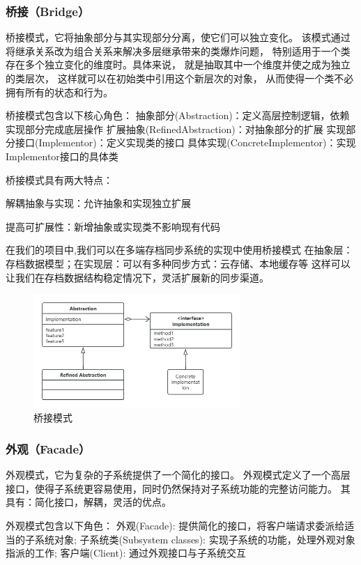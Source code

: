 \documentclass[12pt]{ctexart} %
\begin{document}
\subsubsection{桥接（Bridge）} 
桥接模式，它将抽象部分与其实现部分分离，使它们可以独立变化。
该模式通过将继承关系改为组合关系来解决多层继承带来的类爆炸问题，
特别适用于一个类存在多个独立变化的维度时。具体来说， 
就是抽取其中一个维度并使之成为独立的类层次， 
这样就可以在初始类中引用这个新层次的对象， 从而使得一个类不必拥有所有的状态和行为。

桥接模式包含以下核心角色：
抽象部分(Abstraction)：定义高层控制逻辑，依赖实现部分完成底层操作
扩展抽象(RefinedAbstraction)：对抽象部分的扩展
实现部分接口(Implementor)：定义实现类的接口
具体实现(ConcreteImplementor)：实现Implementor接口的具体类

桥接模式具有两大特点：

解耦抽象与实现：允许抽象和实现独立扩展

提高可扩展性：新增抽象或实现类不影响现有代码

在我们的项目中,我们可以在多端存档同步系统的实现中使用桥接模式
在抽象层：存档数据模型；在实现层：可以有多种同步方式：云存储、本地缓存等
这样可以让我们在存档数据结构稳定情况下，灵活扩展新的同步渠道。
\begin{figure}[H]
  \centering
  \includegraphics[width=0.7\textwidth]{qiaojie.png}
  \caption{桥接模式}
\end{figure}
\subsubsection{外观（Facade）} 
外观模式，它为复杂的子系统提供了一个简化的接口。
外观模式定义了一个高层接口，使得子系统更容易使用，同时仍然保持对子系统功能的完整访问能力。
其具有：简化接口，解耦，灵活的优点。

外观模式包含以下角色：
外观(Facade): 提供简化的接口，将客户端请求委派给适当的子系统对象;
子系统类(Subsystem classes): 实现子系统的功能，处理外观对象指派的工作;
客户端(Client): 通过外观接口与子系统交互
\end{document}
